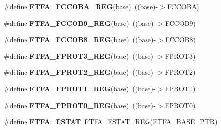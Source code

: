 \begin{DoxyCompactItemize}
\#define {\bfseries F\+T\+F\+A\+\_\+\+F\+C\+C\+O\+B\+A\+\_\+\+R\+EG}(base)~((base)-\/$>$F\+C\+C\+O\+BA)
\item 
\mbox{\label{group___f_t_f_a___register___accessor___macros_gaddf8d17093c5f1472cbd12929f739e83}} 
\#define {\bfseries F\+T\+F\+A\+\_\+\+F\+C\+C\+O\+B9\+\_\+\+R\+EG}(base)~((base)-\/$>$F\+C\+C\+O\+B9)
\item 
\mbox{\label{group___f_t_f_a___register___accessor___macros_ga1c2e5d62119ebc85448dc66ab839f9c0}} 
\#define {\bfseries F\+T\+F\+A\+\_\+\+F\+C\+C\+O\+B8\+\_\+\+R\+EG}(base)~((base)-\/$>$F\+C\+C\+O\+B8)
\item 
\mbox{\label{group___f_t_f_a___register___accessor___macros_ga9ab71b9801803b3de2874a54d96cab14}} 
\#define {\bfseries F\+T\+F\+A\+\_\+\+F\+P\+R\+O\+T3\+\_\+\+R\+EG}(base)~((base)-\/$>$F\+P\+R\+O\+T3)
\item 
\mbox{\label{group___f_t_f_a___register___accessor___macros_ga10f91d56cdb6b3593e774d84f6052875}} 
\#define {\bfseries F\+T\+F\+A\+\_\+\+F\+P\+R\+O\+T2\+\_\+\+R\+EG}(base)~((base)-\/$>$F\+P\+R\+O\+T2)
\item 
\mbox{\label{group___f_t_f_a___register___accessor___macros_ga80a3353ab5eabe7bde5fee5328bdc908}} 
\#define {\bfseries F\+T\+F\+A\+\_\+\+F\+P\+R\+O\+T1\+\_\+\+R\+EG}(base)~((base)-\/$>$F\+P\+R\+O\+T1)
\item 
\mbox{\label{group___f_t_f_a___register___accessor___macros_gae6f345fa6f7defc0912a0dcc9f217dbf}} 
\#define {\bfseries F\+T\+F\+A\+\_\+\+F\+P\+R\+O\+T0\+\_\+\+R\+EG}(base)~((base)-\/$>$F\+P\+R\+O\+T0)
\item 
\mbox{\label{group___f_t_f_a___register___accessor___macros_ga54f18a52ec7e47531cd9c02139af018d}} 
\#define {\bfseries F\+T\+F\+A\+\_\+\+F\+S\+T\+AT}~F\+T\+F\+A\+\_\+\+F\+S\+T\+A\+T\+\_\+\+R\+EG(\hyperlink{group___f_t_f_a___peripheral_ga13ad52f12d5b04e5e01f69ab18ed9216}{F\+T\+F\+A\+\_\+\+B\+A\+S\+E\+\_\+\+P\+TR})

\end{DoxyCompactItemize}
